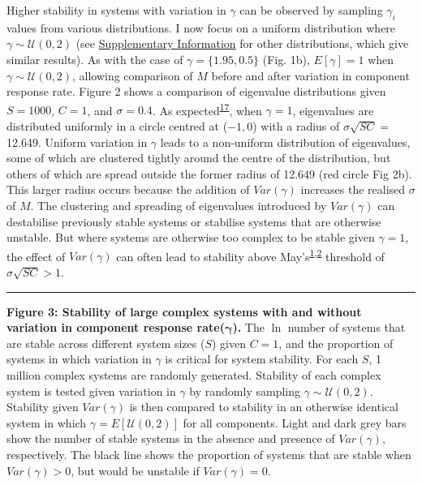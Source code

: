\documentclass[]{article}
\begin{document}
Higher stability in systems with variation in \(\gamma\) can be observed
by sampling \(\gamma_{i}\) values from various distributions. I now
focus on a uniform distribution where \(\gamma \sim \mathcal{U}(0, 2)\)
(see \hyperlink{SIstart}{Supplementary Information} for other distributions, 
which give
similar results). As with the case of \(\gamma = \{1.95, 0.5\}\) (Fig.
1b), \(E[\gamma] = 1\) when \(\gamma \sim \mathcal{U}(0, 2)\), allowing
comparison of \(M\) before and after variation in component response
rate. Figure 2 shows a comparison of eigenvalue distributions given
\(S = 1000\), \(C = 1\), and \(\sigma = 0.4\). As
expected\textsuperscript{\protect\hyperlink{ref-Tao2010}{17}}, when
\(\gamma = 1\), eigenvalues are distributed uniformly in a circle
centred at (\(-1, 0\)) with a radius of \(\sigma\sqrt{SC} =\) 12.649.
Uniform variation in \(\gamma\) leads to a non-uniform distribution of
eigenvalues, some of which are clustered tightly around the centre of
the distribution, but others of which are spread outside the former
radius of 12.649 (red circle Fig 2b). This larger radius occurs because
the addition of \(Var(\gamma)\) increases the realised \(\sigma\) of
\(M\). The clustering and spreading of eigenvalues introduced by
\(Var(\gamma)\) can destabilise previously stable systems or stabilise
systems that are otherwise unstable. But where systems are otherwise too
complex to be stable given \(\gamma = 1\), the effect of \(Var(\gamma)\)
can often lead to stability above
May's\textsuperscript{\protect\hyperlink{ref-May1972}{1},\protect\hyperlink{ref-Allesina2012}{2}}
threshold of \(\sigma\sqrt{SC} > 1\).

\begin{center}\rule{0.5\linewidth}{\linethickness}\end{center}

\textbf{Figure 3: Stability of large complex systems with and without
variation in component response rate(\(\boldsymbol{\gamma}\)).} The
\(\ln\) number of systems that are stable across different system sizes
(\(S\)) given \(C = 1\), and the proportion of systems in which
variation in \(\gamma\) is critical for system stability. For each
\(S\), 1 million complex systems are randomly generated. Stability of
each complex system is tested given variation in \(\gamma\) by randomly
sampling \(\gamma \sim \mathcal{U}(0, 2)\). Stability given
\(Var(\gamma)\) is then compared to stability in an otherwise identical
system in which \(\gamma = E[\mathcal{U}(0, 2)]\) for all components.
Light and dark grey bars show the number of stable systems in the
absence and presence of \(Var(\gamma)\), respectively. The black line
shows the proportion of systems that are stable when
\(Var(\gamma) > 0\), but would be unstable if \(Var(\gamma) = 0\).
\end{document}
